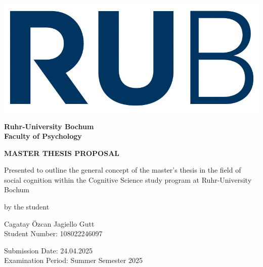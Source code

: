\documentclass[12pt]{article} %
\begin{document}


\begin{titlepage}
    \begin{center}
        \begin{minipage}{0.2\textwidth}
            \includegraphics[width=1.5\textwidth]{../EV_images/rub.jpg} %
        \end{minipage}
        \hspace*{\fill}
        \begin{minipage}{0.6\textwidth}
            \hspace*{\fill}\textbf{Ruhr-University Bochum} \\ \hspace*{\fill}\textbf{Faculty of Psychology}
        \end{minipage}

        \vspace{2 cm}
        {\textbf{\large MASTER THESIS PROPOSAL}}

        \vspace{0.2cm}
        Presented to outline the general concept of the master's thesis in the field of social cognition within the Cognitive Science study program at Ruhr-University Bochum

        \vspace{0.5cm}
        by the student

        \vspace{0.5cm}
        Cagatay Özcan Jagiello Gutt\\
        Student Number: 108022246097

        \vspace{0.5cm}
        Submission Date: 24.04.2025\\
        Examination Period: Summer Semester 2025


\end{center}
\end{titlepage}
\end{document}
